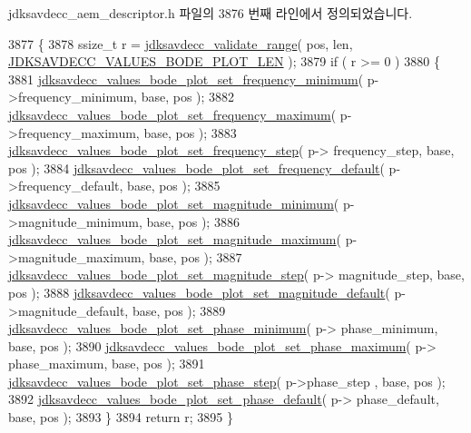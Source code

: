 jdksavdecc\+\_\+aem\+\_\+descriptor.\+h 파일의 3876 번째 라인에서 정의되었습니다.


\begin{DoxyCode}
3877 \{
3878     ssize\_t r = \hyperlink{group__util_ga9c02bdfe76c69163647c3196db7a73a1}{jdksavdecc\_validate\_range}( pos, len, 
      \hyperlink{group__values__bode__plot_gac4af7f3202cb861443874d22de9776b0}{JDKSAVDECC\_VALUES\_BODE\_PLOT\_LEN} );
3879     \textcolor{keywordflow}{if} ( r >= 0 )
3880     \{
3881         \hyperlink{group__values__bode__plot_ga4bc049bde001b125fef83160f6f5e502}{jdksavdecc\_values\_bode\_plot\_set\_frequency\_minimum}(
       p->frequency\_minimum, base, pos );
3882         \hyperlink{group__values__bode__plot_ga0650df7706ceeffaa288eb6f065c963d}{jdksavdecc\_values\_bode\_plot\_set\_frequency\_maximum}(
       p->frequency\_maximum, base, pos );
3883         \hyperlink{group__values__bode__plot_gab59cc094333d8adfee9dce3d030958a1}{jdksavdecc\_values\_bode\_plot\_set\_frequency\_step}( p->
      frequency\_step, base, pos );
3884         \hyperlink{group__values__bode__plot_gab236bb981ea93a9799523eb2037dca34}{jdksavdecc\_values\_bode\_plot\_set\_frequency\_default}(
       p->frequency\_default, base, pos );
3885         \hyperlink{group__values__bode__plot_gac46cee4d37a2740863d8e6c20e0eb2b4}{jdksavdecc\_values\_bode\_plot\_set\_magnitude\_minimum}(
       p->magnitude\_minimum, base, pos );
3886         \hyperlink{group__values__bode__plot_ga2ea51d8f5b19b166a4545983d34b3817}{jdksavdecc\_values\_bode\_plot\_set\_magnitude\_maximum}(
       p->magnitude\_maximum, base, pos );
3887         \hyperlink{group__values__bode__plot_gaf192bb04397acd675322776e689ec4c3}{jdksavdecc\_values\_bode\_plot\_set\_magnitude\_step}( p->
      magnitude\_step, base, pos );
3888         \hyperlink{group__values__bode__plot_ga1aa5ce64fcadaa768c1dcea8416ea9c3}{jdksavdecc\_values\_bode\_plot\_set\_magnitude\_default}(
       p->magnitude\_default, base, pos );
3889         \hyperlink{group__values__bode__plot_gad90dab1d353147991550ca5d685d99ac}{jdksavdecc\_values\_bode\_plot\_set\_phase\_minimum}( p->
      phase\_minimum, base, pos );
3890         \hyperlink{group__values__bode__plot_ga5283a631c338c004c3e31c2ef3ffd9e0}{jdksavdecc\_values\_bode\_plot\_set\_phase\_maximum}( p->
      phase\_maximum, base, pos );
3891         \hyperlink{group__values__bode__plot_gae995eadca352cec734a9195b33693360}{jdksavdecc\_values\_bode\_plot\_set\_phase\_step}( p->phase\_step
      , base, pos );
3892         \hyperlink{group__values__bode__plot_gada6eff3f3ca8ac20625390dcbd2f76d1}{jdksavdecc\_values\_bode\_plot\_set\_phase\_default}( p->
      phase\_default, base, pos );
3893     \}
3894     \textcolor{keywordflow}{return} r;
3895 \}
\end{DoxyCode}


